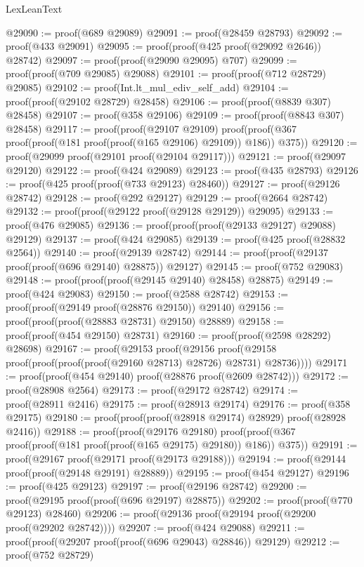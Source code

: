 \begin{lexlean}{LexLeanText}
\begin{coremodule}
@29090 := proof(@689 @29089)
@29091 := proof(@28459 @28793)
@29092 := proof(@433 @29091)
@29095 := proof(proof(@425 proof(@29092 @2646)) @28742)
@29097 := proof(proof(@29090 @29095) @707)
@29099 := proof(proof(@709 @29085) @29088)
@29101 := proof(proof(@712 @28729) @29085)
@29102 := proof(Int.lt_mul_ediv_self_add)
@29104 := proof(proof(@29102 @28729) @28458)
@29106 := proof(proof(@8839 @307) @28458)
@29107 := proof(@358 @29106)
@29109 := proof(proof(@8843 @307) @28458)
@29117 := proof(proof(@29107 @29109)
      proof(proof(@367 proof(proof(@181 proof(proof(@165 @29106) @29109)) @186)) @375))
@29120 := proof(@29099 proof(@29101 proof(@29104 @29117)))
@29121 := proof(@29097 @29120)
@29122 := proof(@424 @29089)
@29123 := proof(@435 @28793)
@29126 := proof(@425 proof(proof(@733 @29123) @28460))
@29127 := proof(@29126 @28742)
@29128 := proof(@292 @29127)
@29129 := proof(@2664 @28742)
@29132 := proof(proof(@29122 proof(@29128 @29129)) @29095)
@29133 := proof(@476 @29085)
@29136 := proof(proof(proof(@29133 @29127) @29088) @29129)
@29137 := proof(@424 @29085)
@29139 := proof(@425 proof(@28832 @2564))
@29140 := proof(@29139 @28742)
@29144 := proof(proof(@29137 proof(proof(@696 @29140) @28875)) @29127)
@29145 := proof(@752 @29083)
@29148 := proof(proof(proof(@29145 @29140) @28458) @28875)
@29149 := proof(@424 @29083)
@29150 := proof(@2588 @28742)
@29153 := proof(proof(@29149 proof(@28876 @29150)) @29140)
@29156 := proof(proof(proof(@28883 @28731) @29150) @28889)
@29158 := proof(proof(@454 @29150) @28731)
@29160 := proof(proof(@2598 @28292) @28698)
@29167 := proof(@29153
      proof(@29156 proof(@29158 proof(proof(proof(proof(@29160 @28713) @28726) @28731) @28736))))
@29171 := proof(proof(@454 @29140) proof(@28876 proof(@2609 @28742)))
@29172 := proof(@28908 @2564)
@29173 := proof(@29172 @28742)
@29174 := proof(@28911 @2416)
@29175 := proof(@28913 @29174)
@29176 := proof(@358 @29175)
@29180 := proof(proof(proof(@28918 @29174) @28929) proof(@28928 @2416))
@29188 := proof(proof(@29176 @29180)
      proof(proof(@367 proof(proof(@181 proof(proof(@165 @29175) @29180)) @186)) @375))
@29191 := proof(@29167 proof(@29171 proof(@29173 @29188)))
@29194 := proof(@29144 proof(proof(@29148 @29191) @28889))
@29195 := proof(@454 @29127)
@29196 := proof(@425 @29123)
@29197 := proof(@29196 @28742)
@29200 := proof(@29195 proof(proof(@696 @29197) @28875))
@29202 := proof(proof(@770 @29123) @28460)
@29206 := proof(@29136 proof(@29194 proof(@29200 proof(@29202 @28742))))
@29207 := proof(@424 @29088)
@29211 := proof(proof(@29207 proof(proof(@696 @29043) @28846)) @29129)
@29212 := proof(@752 @28729)

\end{coremodule}
\end{lexlean}

